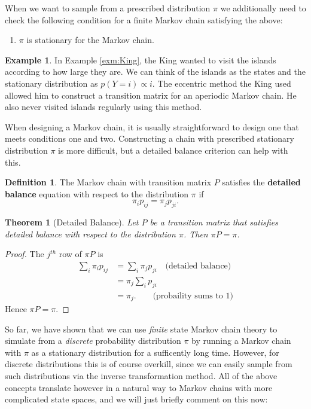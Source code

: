 \documentclass[
]{book}
\providecommand{\tightlist}{%
  \setlength{\itemsep}{0pt}\setlength{\parskip}{0pt}}
\newtheorem{theorem}{Theorem}[chapter]
\theoremstyle{definition}
\newtheorem{definition}{Definition}[chapter]
\theoremstyle{definition}
\newtheorem{example}{Example}[chapter]
\theoremstyle{definition}
\theoremstyle{definition}
\theoremstyle{remark}
\begin{document}
When we want to sample from a prescribed distribution \(\pi\) we additionally need to check the following condition for a finite Markov chain satisfying the above:

\begin{enumerate}
\def\labelenumi{\arabic{enumi}.}
\setcounter{enumi}{2}
\tightlist
\item
  \(\pi\) is stationary for the Markov chain.
\end{enumerate}

\begin{example}
In Example \ref{exm:King}, the King wanted to visit the islands according to how large they are. We can think of the islands as the states and the stationary distribution as \(p(Y = i) \propto i\). The eccentric method the King used allowed him to construct a transition matrix for an aperiodic Markov chain. He also never visited islands regularly using this method.
\end{example}

When designing a Markov chain, it is usually straightforward to design one that meets conditions one and two. Constructing a chain with prescribed stationary distribution \(\pi\) is more difficult, but a detailed balance criterion can help with this.

\begin{definition}
The Markov chain with transition matrix \(P\) satisfies the \textbf{detailed balance} equation with respect to the distribution \(\pi\) if
\[
\pi_i p_{ij} = \pi_j p_{ji}. 
\]
\end{definition}

\begin{theorem}[Detailed Balance]
Let \(P\) be a transition matrix that satisfies detailed balance with respect to the distribution \(\pi\). Then \(\pi P = \pi\).
\end{theorem}

\begin{proof}
The \(j^{th}\) row of \(\pi P\) is
\begin{align*}
\sum_{i} \pi_i p_{ij} & = \sum_{i} \pi_j p_{ji} \quad \textrm{(detailed balance)} \\
 & = \pi_j \sum_{i} p_{ji} \\
 & = \pi_j.\qquad \textrm{(probaility sums to 1)}
\end{align*}
Hence \(\pi P = \pi\).
\end{proof}

So far, we have shown that we can use \emph{finite} state Markov chain theory to simulate from a \emph{discrete} probability distribution \(\pi\) by running a Markov chain with \(\pi\) as a stationary distribution for a sufficently long time. However, for discrete distributions this is of course overkill, since we can easily sample from such distributions via the inverse transformation method. All of the above concepts translate however in a natural way to Markov chains with more complicated state spaces, and we will just briefly comment on this now:
\end{document}
